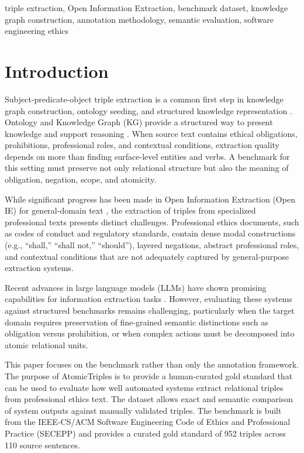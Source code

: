 \documentclass[conference]{IEEEtran}
\begin{document}
\begin{IEEEkeywords}
triple extraction, Open Information Extraction, benchmark dataset, knowledge graph construction, annotation methodology, semantic evaluation, software engineering ethics
\end{IEEEkeywords}

\section{Introduction}
Subject-predicate-object triple extraction is a common first step in knowledge graph construction, ontology seeding, and structured knowledge representation \cite{hogan2021knowledge}. Ontology and Knowledge Graph (KG) provide a structured way to present knowledge and support reasoning \cite{vergara2023schematic}. When source text contains ethical obligations, prohibitions, professional roles, and contextual conditions, extraction quality depends on more than finding surface-level entities and verbs. A benchmark for this setting must preserve not only relational structure but also the meaning of obligation, negation, scope, and atomicity.

While significant progress has been made in Open Information Extraction (Open IE) for general-domain text \cite{angeli2015leveraging, kolluru2020openie6}, the extraction of triples from specialized professional texts presents distinct challenges. Professional ethics documents, such as codes of conduct and regulatory standards, contain dense modal constructions (e.g., ``shall,'' ``shall not,'' ``should''), layered negations, abstract professional roles, and contextual conditions that are not adequately captured by general-purpose extraction systems.

Recent advances in large language models (LLMs) have shown promising capabilities for information extraction tasks \cite{wei2023chatie, wadhwa2023revisiting}. However, evaluating these systems against structured benchmarks remains challenging, particularly when the target domain requires preservation of fine-grained semantic distinctions such as obligation versus prohibition, or when complex actions must be decomposed into atomic relational units.

This paper focuses on the benchmark rather than only the annotation framework. The purpose of AtomicTriples is to provide a human-curated gold standard that can be used to evaluate how well automated systems extract relational triples from professional ethics text. The dataset allows exact and semantic comparison of system outputs against manually validated triples. The benchmark is built from the IEEE-CS/ACM Software Engineering Code of Ethics and Professional Practice (SECEPP) \cite{acm1999code} and provides a curated gold standard of 952 triples across 110 source sentences.
\end{document}

